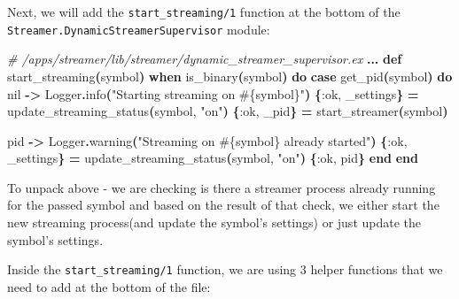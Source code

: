 \documentclass[
  oneside]{book}
\newenvironment{Shaded}{\begin{snugshade}}{\end{snugshade}}
\newcommand{\CommentTok}[1]{\textcolor[rgb]{0.56,0.35,0.01}{\textit{#1}}}
\newcommand{\ConstantTok}[1]{\textcolor[rgb]{0.56,0.35,0.01}{#1}}
\newcommand{\FunctionTok}[1]{\textcolor[rgb]{0.13,0.29,0.53}{\textbf{#1}}}
\newcommand{\KeywordTok}[1]{\textcolor[rgb]{0.13,0.29,0.53}{\textbf{#1}}}
\newcommand{\NormalTok}[1]{#1}
\newcommand{\OperatorTok}[1]{\textcolor[rgb]{0.81,0.36,0.00}{\textbf{#1}}}
\newcommand{\OtherTok}[1]{\textcolor[rgb]{0.56,0.35,0.01}{#1}}
\newcommand{\StringTok}[1]{\textcolor[rgb]{0.31,0.60,0.02}{#1}}
\newcommand{\VariableTok}[1]{\textcolor[rgb]{0.00,0.00,0.00}{#1}}
\begin{document}
Next, we will add the \texttt{start\_streaming/1} function at the bottom of the\\
\texttt{Streamer.DynamicStreamerSupervisor} module:

\begin{Shaded}
\begin{Highlighting}[]
\CommentTok{\# /apps/streamer/lib/streamer/dynamic\_streamer\_supervisor.ex}
  \OperatorTok{...}
  \KeywordTok{def}\NormalTok{ start\_streaming}\FunctionTok{(}\NormalTok{symbol}\FunctionTok{)} \KeywordTok{when}\NormalTok{ is\_binary}\FunctionTok{(}\NormalTok{symbol}\FunctionTok{)} \KeywordTok{do}
    \KeywordTok{case}\NormalTok{ get\_pid}\FunctionTok{(}\NormalTok{symbol}\FunctionTok{)} \KeywordTok{do}
      \ConstantTok{nil} \OperatorTok{{-}\textgreater{}}
        \ConstantTok{Logger}\OperatorTok{.}\NormalTok{info}\FunctionTok{(}\StringTok{"Starting streaming on }\OtherTok{\#\{}\NormalTok{symbol}\OtherTok{\}}\StringTok{"}\FunctionTok{)}
        \FunctionTok{\{}\VariableTok{:ok}\NormalTok{, \_settings}\FunctionTok{\}} \OperatorTok{=}\NormalTok{ update\_streaming\_status}\FunctionTok{(}\NormalTok{symbol, }\StringTok{"on"}\FunctionTok{)}
        \FunctionTok{\{}\VariableTok{:ok}\NormalTok{, \_pid}\FunctionTok{\}} \OperatorTok{=}\NormalTok{ start\_streamer}\FunctionTok{(}\NormalTok{symbol}\FunctionTok{)}

\NormalTok{      pid }\OperatorTok{{-}\textgreater{}}
        \ConstantTok{Logger}\OperatorTok{.}\NormalTok{warning}\FunctionTok{(}\StringTok{"Streaming on }\OtherTok{\#\{}\NormalTok{symbol}\OtherTok{\}}\StringTok{ already started"}\FunctionTok{)}
        \FunctionTok{\{}\VariableTok{:ok}\NormalTok{, \_settings}\FunctionTok{\}} \OperatorTok{=}\NormalTok{ update\_streaming\_status}\FunctionTok{(}\NormalTok{symbol, }\StringTok{"on"}\FunctionTok{)}
        \FunctionTok{\{}\VariableTok{:ok}\NormalTok{, pid}\FunctionTok{\}}
    \KeywordTok{end}
  \KeywordTok{end}
\end{Highlighting}
\end{Shaded}

To unpack above - we are checking is there a streamer process already running for the passed symbol and based on the result of that check, we either start the new streaming process(and update the symbol's settings) or just update the symbol's settings.

Inside the \texttt{start\_streaming/1} function, we are using 3 helper functions that we need to add at the bottom of the file:
\end{document}
